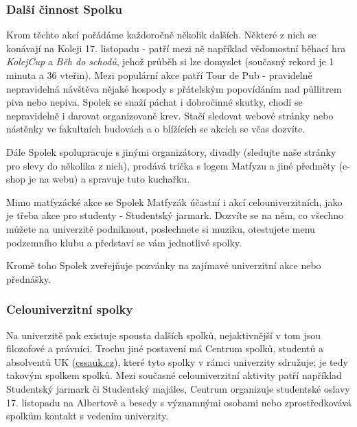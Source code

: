 \subsubsection{Další činnost Spolku}
Krom těchto akcí pořádáme každoročně několik dalších. Některé z nich se konávají
na Koleji 17. listopadu - patří mezi ně například vědomostní běhací hra
\textit{KolejCup} a \textit{Běh do schodů}, jehož průběh si lze domyslet
(současný rekord je 1 minuta a 36 vteřin). Mezi populární akce patří Tour de Pub
- pravidelně nepravidelná návštěva nějaké hospody s přátelským popovídáním nad
půllitrem piva nebo nepiva.
Spolek se snaží páchat i dobročinné skutky, chodí se nepravidelně i darovat organizovaně krev.
Stačí sledovat webové stránky nebo nástěnky ve
fakultních budovách a o blížících se akcích se včas dozvíte.

Dále Spolek spolupracuje s jinými organizátory, divadly (sledujte naše stránky
pro slevy do několika z nich), prodává trička s logem Matfyzu a jiné předměty
(e-shop je na webu) a spravuje tuto kuchařku.

Mimo matfyzácké akce se Spolek Matfyzák účastní i akcí celouniverzitních, jako
je třeba akce pro studenty - Studentský jarmark. Dozvíte se na něm, co všechno
můžete na univerzitě podniknout, poslechnete si muziku, otestujete menu
podzemního klubu a představí se vám jednotlivé spolky.

Kromě toho Spolek zveřejňuje pozvánky na zajímavé univerzitní akce nebo
přednášky.



\subsubsection{Celouniverzitní spolky}
Na univerzitě pak existuje spousta dalších spolků, nejaktivnější v tom jsou
filozofové a právníci. Trochu jiné postavení má Centrum spolků, studentů a
absolventů UK (\url{cssauk.cz}), které tyto spolky v rámci univerzity sdružuje;
je tedy takovým spolkem spolků. Mezi současné celouniverzitní aktivity patří
například Studentský jarmark či Studentský majáles, Centrum organizuje
studentské oslavy 17. listopadu na Albertově a besedy s významnými osobami nebo
zprostředkovává spolkům kontakt s vedením univerzity.